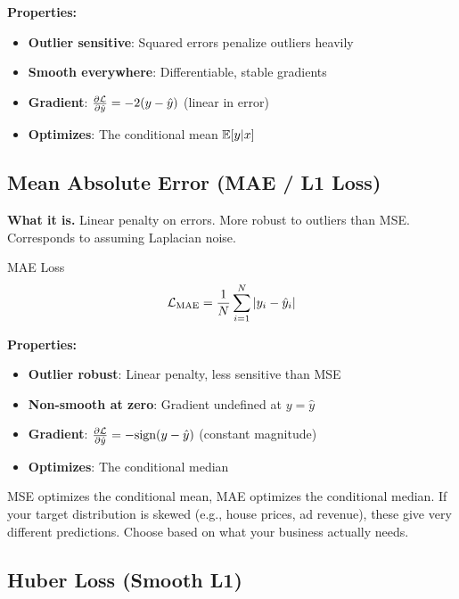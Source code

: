\textbf{Properties:}
\begin{itemize}
    \item \textbf{Outlier sensitive}: Squared errors penalize outliers heavily
    \item \textbf{Smooth everywhere}: Differentiable, stable gradients
    \item \textbf{Gradient}: $\frac{\partial \mathcal{L}}{\partial \hat{y}} = -2(y - \hat{y})$ (linear in error)
    \item \textbf{Optimizes}: The conditional mean $\operatorname{\mathbb{E}}[y | x]$
\end{itemize}

\subsection{Mean Absolute Error (MAE / L1 Loss)}

\textbf{What it is.} Linear penalty on errors. More robust to outliers than MSE. Corresponds to assuming Laplacian noise.

\begin{mathresult}{MAE Loss}
\begin{equation}
\mathcal{L}_{\text{MAE}} = \frac{1}{N}\sum_{i=1}^{N}|y_i - \hat{y}_i|
\end{equation}
\end{mathresult}

\textbf{Properties:}
\begin{itemize}
    \item \textbf{Outlier robust}: Linear penalty, less sensitive than MSE
    \item \textbf{Non-smooth at zero}: Gradient undefined at $y = \hat{y}$
    \item \textbf{Gradient}: $\frac{\partial \mathcal{L}}{\partial \hat{y}} = -\text{sign}(y - \hat{y})$ (constant magnitude)
    \item \textbf{Optimizes}: The conditional median
\end{itemize}

\begin{warningbox}
MSE optimizes the conditional mean, MAE optimizes the conditional median. If your target distribution is skewed (e.g., house prices, ad revenue), these give very different predictions. Choose based on what your business actually needs.
\end{warningbox}

\subsection{Huber Loss (Smooth L1)}

